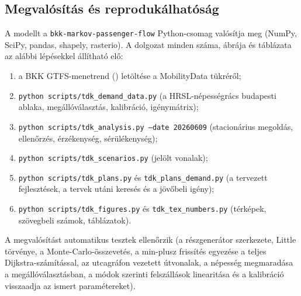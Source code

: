 \documentclass[12pt,a4paper]{article}
\theoremstyle{definition}
\theoremstyle{remark}
\begin{document}
\subsection{Megvalósítás és reprodukálhatóság}
\label{app:repro}

A modellt a \texttt{bkk-markov-passenger-flow} Python-csomag valósítja meg
(NumPy, SciPy, pandas, shapely, rasterio). A dolgozat minden száma, ábrája és
táblázata az alábbi lépésekkel állítható elő:
\begin{enumerate}
  \item a BKK GTFS-menetrend (\FEEDVER) letöltése a MobilityData tükréről;
  \item \texttt{python scripts/tdk\_demand\_data.py} (a HRSL-népességrács
    budapesti ablaka, megállóválasztás, kalibráció, igénymátrix);
  \item \texttt{python scripts/tdk\_analysis.py --date 20260609}
    (stacionárius megoldás, ellenőrzés, érzékenység, sérülékenység);
  \item \texttt{python scripts/tdk\_scenarios.py} (jelölt vonalak);
  \item \texttt{python scripts/tdk\_plans.py} és
    \texttt{tdk\_plans\_demand.py} (a tervezett fejlesztések, a tervek utáni
    keresés és a jövőbeli igény);
  \item \texttt{python scripts/tdk\_figures.py} és
    \texttt{tdk\_tex\_numbers.py} (térképek, szövegbeli számok, táblázatok).
\end{enumerate}
A megvalósítást automatikus tesztek ellenőrzik (a részgenerátor szerkezete,
Little törvénye, a Monte-Carlo-összevetés, a min-plusz frissítés egyezése a
teljes Dijkstra-számítással, az utcagráfon vezetett útvonalak, a népesség
megmaradása a megállóválasztásban, a módok szerinti felszállások
linearitása és a kalibráció visszaadja az ismert paramétereket).
\end{document}
